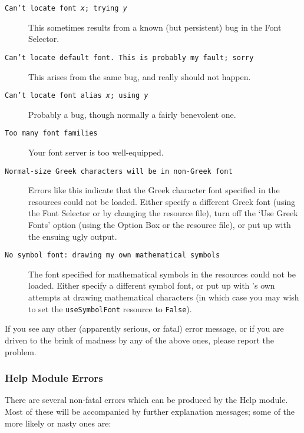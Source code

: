 \begin{description}
\item[{\tt Can't locate font~{\it x\/}; trying~{\it y\/}}]\hskip
0.6pc\relax This sometimes results from a known (but persistent) bug
in the Font Selector.

\item[{\tt Can't locate default font.  This is probably my fault;
sorry}]\hskip 0.6pc\relax This arises from the same bug, and really
should not happen.

\item[{\tt Can't locate font alias~{\it x\/}; using~{\it y\/}}]\hskip
0.6pc\relax Probably a bug, though normally a fairly benevolent one.

\item[{\tt Too many font families}]\hskip 0.6pc\relax Your font server
is too well-equipped.

\item[{\tt Normal-size Greek characters will be in non-Greek
font}]\hskip 0.6pc\relax Errors like this indicate that the Greek
character font specified in the resources could not be loaded.  Either
specify a different Greek font (using the Font Selector or by changing
the resource file), turn off the `Use Greek Fonts' option (using the
Option Box or the resource file), or put up with the ensuing ugly
output.

\item[{\tt No symbol font:~drawing my own mathematical symbols}]\hskip
0.6pc\relax The font specified for mathematical symbols in the
resources could not be loaded.  Either specify a different symbol
font, or put up with \xr's own attempts at drawing mathematical
characters (in which case you may wish to set the {\tt useSymbolFont}
resource to {\tt False}).  \end{description}

If you see any other (apparently serious, or fatal) error message, or
if you are driven to the brink of madness by any of the above ones,
please report the problem.

\subsubsection{Help Module Errors}

There are several non-fatal errors which can be produced by the Help
module.  Most of these will be accompanied by further explanation
messages; some of the more likely or nasty ones are:

